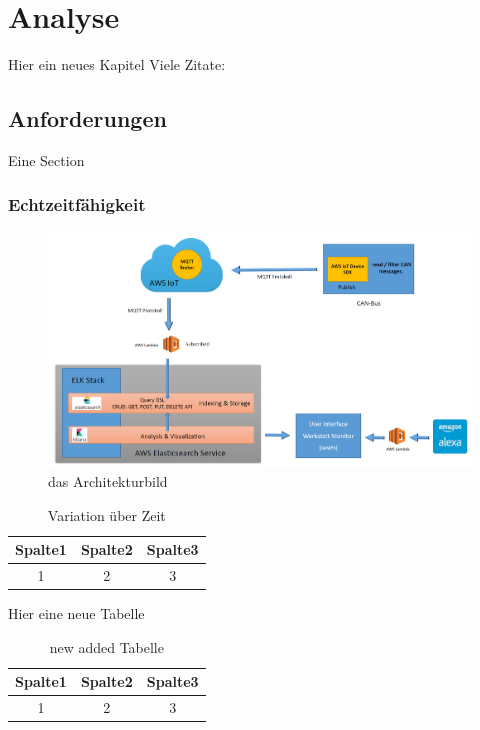\chapter{Analyse}
    Hier ein neues Kapitel
    Viele Zitate: \autocite[]{patterson} \autocite[]{krizhevsky} \autocite[]{matlab} \cite{pitts} \cite{lawrence} \cite{miesbach}
    \section{Anforderungen}
        Eine Section
        \subsection{Echtzeitfähigkeit}
            \begin{figure}[h]
                \includegraphics[scale=0.2]{Abbildungen/Kapitel3/Big-architecture.png}
                \centering
                \caption{das Architekturbild}
                \label{Abb:Architekturbild}   
            \end{figure}  
             \begin{table}[h]
                \begin{tabular}{ccc}
                      \hline
                      Spalte1 & Spalte2 & Spalte3\\                      
                      \hline
                      1 & 2 & 3\\
                      \hline
                \end{tabular}
                \centering
                \caption{Variation über Zeit}
                \label{Tab:Tabelle3}
            \end{table}
            
Hier eine neue Tabelle   
            
            \begin{table}[h]
                \begin{tabular}{ccc}
                      \hline
                      Spalte1 & Spalte2 & Spalte3\\                      
                      \hline
                      1 & 2 & 3\\
                      \hline
                \end{tabular}
                \centering
                \caption{new added Tabelle}
                \label{Tab:New added}
            \end{table}
 

